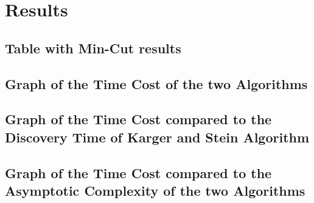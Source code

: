 \section{Results}\label{results}

\subsection{Table with Min-Cut results}
	
	

\subsection{Graph of the Time Cost of the two Algorithms}



\subsection{Graph of the Time Cost compared to the Discovery Time of Karger and Stein Algorithm}



\subsection{Graph of the Time Cost compared to the Asymptotic Complexity of the two Algorithms}



\pagebreak
